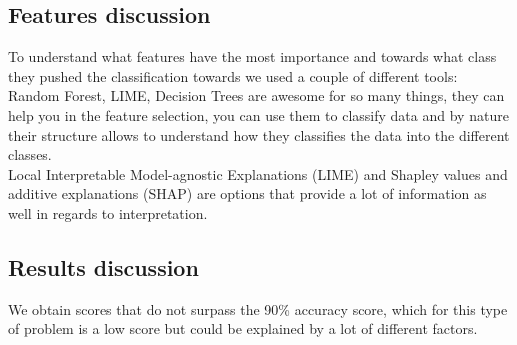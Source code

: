 \subsection{Features discussion}
To understand what features have the most importance and towards what class they pushed the classification towards we used a couple of different tools: Random Forest, LIME, 
Decision Trees are awesome for so many things, they can help you in the feature selection, you can use them to classify data and by nature their structure allows to understand how they classifies the data into the different classes.\\
Local Interpretable Model-agnostic Explanations (LIME) and Shapley values and additive explanations (SHAP) are options that provide a lot of information as well in regards to interpretation.
\subsection{Results discussion}
We obtain scores that do not surpass the 90\% accuracy score, which for this type of problem is a low score but could be explained by a lot of different factors.\\

